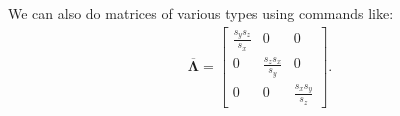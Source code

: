 We can also do matrices of various types using commands like:
\begin{align}
	\overline{\boldsymbol{\Lambda}} = 
	\begin{bmatrix} %
		\displaystyle \frac{s_y s_z}{s_x} & 0 & 0 \\ 
		0 & \displaystyle \frac{s_z s_x}{s_y} & 0 \\
		0 & 0 & \displaystyle \frac{s_x s_y}{s_z} 
	\end{bmatrix}.
\end{align}